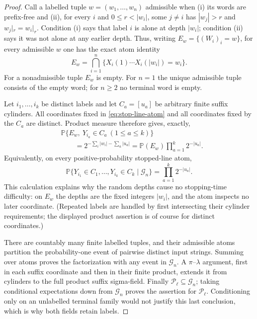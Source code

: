\documentclass[11pt]{article}
\numberwithin{equation}{section}
\newcommand{\1}{\mathbf 1}\newcommand{\F}{\mathcal F}\newcommand{\D}{\mathcal D}
\begin{document}
\begin{proof}
Call a labelled tuple $w=(w_1,\ldots,w_n)$ admissible when (i) its words are
prefix-free and (ii), for every $i$ and $0\le r<|w_i|$, some $j\ne i$ has
$|w_j|>r$ and $w_j|_r=w_i|_r$.  Condition (i) says that label $i$ is alone
at depth $|w_i|$; condition (ii) says it was not alone at any earlier depth.
Thus, writing $E_w=\{(W_i)_i=w\}$, for every admissible $w$ one has the exact
atom identity
\begin{equation}
 E_w=\bigcap_{i=1}^n\{X_i(1)\cdots X_i(|w_i|)=w_i\}.       \label{eq:stop-line-atom}
\end{equation}
For a nonadmissible tuple $E_w$ is empty.  For $n=1$ the unique admissible
tuple consists of the empty word; for $n\ge2$ no terminal word is empty.

Let $i_1,\ldots,i_k$ be distinct labels and let $C_a=[u_a]$ be arbitrary
finite suffix cylinders.  All coordinates fixed in
\eqref{eq:stop-line-atom} and all coordinates fixed by the $C_a$ are
distinct.  Product measure therefore gives, exactly,
\begin{align*}
 &\mathbb P\{E_w,\ Y_{i_a}\in C_a\ (1\le a\le k)\}\\
 &\qquad=2^{-\sum_i|w_i|-\sum_a|u_a|}
 =\mathbb P(E_w)\prod_{a=1}^k2^{-|u_a|}.
\end{align*}
Equivalently, on every positive-probability stopped-line atom,
\[
 \mathbb P\{Y_{i_1}\in C_1,\ldots,Y_{i_k}\in C_k\mid\mathcal G_n\}
 =\prod_{a=1}^k2^{-|u_a|}.
\]
This calculation explains why the random depths cause no stopping-time
difficulty: on $E_w$ the depths are the fixed integers $|w_i|$, and the atom
inspects no later coordinate.  (Repeated labels are handled by first
intersecting their cylinder requirements; the displayed product assertion is
of course for distinct coordinates.)

There are countably many finite labelled tuples, and their admissible atoms
partition the probability-one event of pairwise distinct input strings.
Summing over atoms proves the factorization with any event in $\mathcal G_n$.
A $\pi$--$\lambda$ argument, first in each suffix coordinate and then in
their finite product, extends it from cylinders to the full product suffix
sigma-field.  Finally $\mathcal P_\ell\subseteq\mathcal G_n$; taking conditional
expectations down from $\mathcal G_n$ proves the assertion for
$\mathcal P_\ell$.  Conditioning only on an unlabelled terminal family would
not justify this last conclusion, which is why both fields retain labels.
\end{proof}
\end{document}
